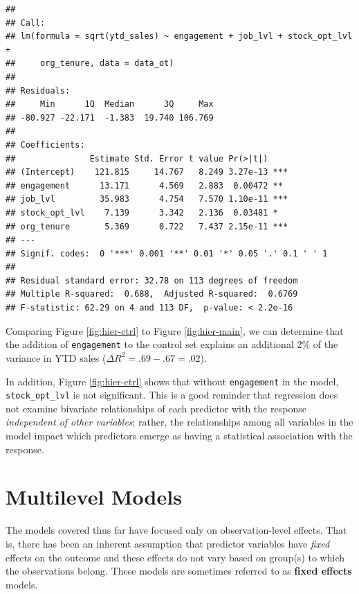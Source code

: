 \documentclass[
]{book}
\begin{document}
\begin{verbatim}
## 
## Call:
## lm(formula = sqrt(ytd_sales) ~ engagement + job_lvl + stock_opt_lvl + 
##     org_tenure, data = data_ot)
## 
## Residuals:
##     Min      1Q  Median      3Q     Max 
## -80.927 -22.171  -1.383  19.740 106.769 
## 
## Coefficients:
##               Estimate Std. Error t value Pr(>|t|)    
## (Intercept)    121.815     14.767   8.249 3.27e-13 ***
## engagement      13.171      4.569   2.883  0.00472 ** 
## job_lvl         35.983      4.754   7.570 1.10e-11 ***
## stock_opt_lvl    7.139      3.342   2.136  0.03481 *  
## org_tenure       5.369      0.722   7.437 2.15e-11 ***
## ---
## Signif. codes:  0 '***' 0.001 '**' 0.01 '*' 0.05 '.' 0.1 ' ' 1
## 
## Residual standard error: 32.78 on 113 degrees of freedom
## Multiple R-squared:  0.688,  Adjusted R-squared:  0.6769 
## F-statistic: 62.29 on 4 and 113 DF,  p-value: < 2.2e-16
\end{verbatim}

Comparing Figure \ref{fig:hier-ctrl} to Figure \ref{fig:hier-main}, we can determine that the addition of \texttt{engagement} to the control set explains an additional 2\% of the variance in YTD sales (\(\Delta R^2 = .69 - .67 = .02\)).

In addition, Figure \ref{fig:hier-ctrl} shows that without \texttt{engagement} in the model, \texttt{stock\_opt\_lvl} is not significant. This is a good reminder that regression does not examine bivariate relationships of each predictor with the response \emph{independent of other variables}; rather, the relationships among all variables in the model impact which predictors emerge as having a statistical association with the response.

\hypertarget{multilevel-models}{%
\section{Multilevel Models}\label{multilevel-models}}

The models covered thus far have focused only on observation-level effects. That is, there has been an inherent assumption that predictor variables have \emph{fixed} effects on the outcome and these effects do not vary based on group(s) to which the observations belong. These models are sometimes referred to as \textbf{fixed effects} models.
\end{document}
